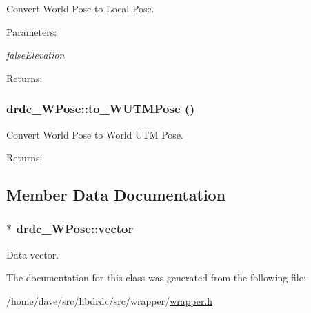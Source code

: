 Convert World Pose to Local Pose. 

\begin{Desc}
\item[Parameters:]
\begin{description}
\item[{\em falseElevation}]\end{description}
\end{Desc}
\begin{Desc}
\item[Returns:]\end{Desc}
\hypertarget{classdrdc__WPose_e66211f37411b436ae76c10939144fcc}{
\subsubsection[to\_\-WUTMPose]{ drdc\_\-WPose::to\_\-WUTMPose ()}}
\label{classdrdc__WPose_e66211f37411b436ae76c10939144fcc}


Convert World Pose to World UTM Pose. 

\begin{Desc}
\item[Returns:]\end{Desc}


\subsection{Member Data Documentation}
\hypertarget{classdrdc__WPose_b02d1988175a6268511d4e13d0702508}{
\subsubsection[vector]{$\ast$ {\bf drdc\_\-WPose::vector}}}
\label{classdrdc__WPose_b02d1988175a6268511d4e13d0702508}


Data vector. 



The documentation for this class was generated from the following file:\begin{CompactItemize}
\item 
/home/dave/src/libdrdc/src/wrapper/\hyperlink{wrapper_8h}{wrapper.h}\end{CompactItemize}
